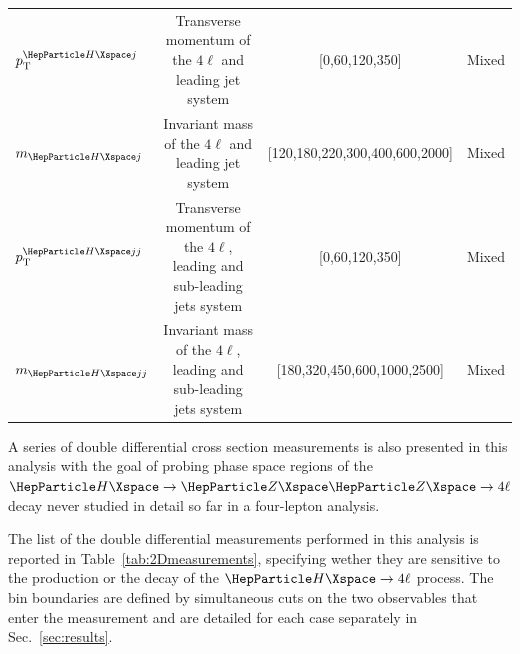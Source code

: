 \begin{table}[tbp]
{\begin{tabular}{lccc}
			$\pt^{\PH j}$ & Transverse momentum of the $4\ell$ and leading jet system & [0,60,120,350] & Mixed\\
			$m_{\PH j}$ & Invariant mass of the $4\ell$ and leading jet system & [120,180,220,300,400,600,2000] & Mixed\\
			$\pt^{\PH jj}$ & Transverse momentum of the $4\ell$, leading and sub-leading jets system & [0,60,120,350] & Mixed\\
			$m_{\PH jj}$ & Invariant mass of the $4\ell$, leading and sub-leading jets system & [180,320,450,600,1000,2500] & Mixed\\
		\end{tabular}
	}
	\label{tab:binBoundaries}
\end{table}

A series of double differential cross section measurements is also presented in this analysis with the goal of probing phase space regions of the $\HZZfl$ decay never studied in detail so far in a four-lepton analysis.


The list of the double differential measurements performed in this analysis is reported in Table~\ref{tab:2Dmeasurements},  specifying wether they are sensitive to the production or the decay of the $\PH\rightarrow 4\ell$ process.
The bin boundaries are defined by simultaneous cuts on the two observables that enter the measurement and are detailed for each case separately in Sec.~\ref{sec:results}.

